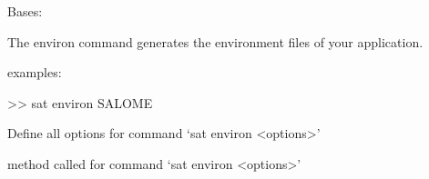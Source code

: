 \documentclass[a4paper,10pt,english]{sphinxmanual}
\begin{document}
\begin{fulllineitems}
\label{\detokenize{apidoc_commands/commands:commands.environ.Command}}
Bases: 

The environ command generates the environment files of your application.

\begin{DUlineblock}{0em}
\item[] examples:
\item[] \textgreater{}\textgreater{} sat environ SALOME
\end{DUlineblock}

\begin{fulllineitems}
\label{\detokenize{apidoc_commands/commands:commands.environ.Command.getParser}}
Define all options for command ‘sat environ \textless{}options\textgreater{}’

\end{fulllineitems}


\begin{fulllineitems}
\label{\detokenize{apidoc_commands/commands:commands.environ.Command.name}}
\end{fulllineitems}


\begin{fulllineitems}
\label{\detokenize{apidoc_commands/commands:commands.environ.Command.run}}
method called for command ‘sat environ \textless{}options\textgreater{}’

\end{fulllineitems}


\end{fulllineitems}

\end{document}
